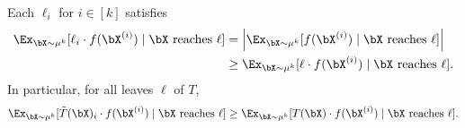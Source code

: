 \documentclass[11pt]{article}
\begin{document}




Each $\ell_i$ for $i\in [k]$ satisfies
\begin{align*}
    \Ex_{\bX\sim\mu^{k}}[\ell_i\cdot f(\bX^{(i)})\mid\bX\text{ reaches }\ell]&=\left|\Ex_{\bX\sim\mu^{k}}[f(\bX^{(i)})\mid\bX\text{ reaches }\ell]\right|\\
    &\ge \Ex_{\bX\sim\mu^{k}}[\ell\cdot f(\bX^{(i)})\mid\bX\text{ reaches }\ell].
\end{align*}
In particular, for all {leaves} $\ell$ of $T$,
\begin{equation}
\label{eq:corr}
    \Ex_{\bX\sim\mu^{k}}[\Tilde{T}(\bX)_i\cdot f(\bX^{(i)})\mid\bX\text{ reaches }\ell]\ge \Ex_{\bX\sim\mu^{k}}[T(\bX)\cdot f(\bX^{(i)})\mid\bX\text{ reaches }\ell].
\end{equation}
\end{document}
